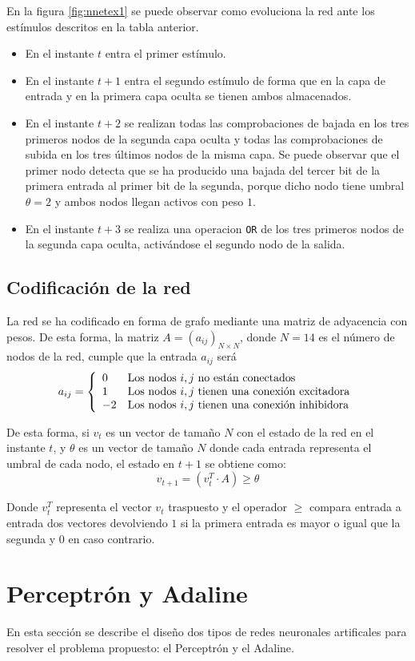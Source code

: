\documentclass[spanish]{assignment}
\begin{document}
	En la figura \ref{fig:nnetex1} se puede observar como evoluciona la red ante los estímulos descritos en la tabla anterior.
	
	
	\begin{itemize}
	\item En el instante $t$ entra el primer estímulo.
	\item En el instante $t+1$ entra el segundo estímulo de forma que en la capa de entrada y en la primera capa oculta se tienen ambos almacenados.
	\item En el instante $t+2$ se realizan todas las comprobaciones de bajada en los tres primeros nodos de la segunda capa oculta y todas las comprobaciones de subida en los tres últimos nodos de la misma capa. Se puede observar que el primer nodo detecta que se ha producido una bajada del tercer bit de la primera entrada al primer bit de la segunda, porque dicho nodo tiene umbral $\theta=2$ y ambos nodos llegan activos con peso $1$.
	
	\item En el instante $t+3$ se realiza una operacion \texttt{OR} de los tres primeros nodos de la segunda capa oculta, activándose el segundo nodo de la salida.
	\end{itemize} 
	
	\subsection{Codificación de la red}
	La red se ha codificado en forma de grafo mediante una matriz de adyacencia con pesos. De esta forma, la matriz $A = (a_{ij})_{N\times N}$, donde $N=14$ es el número de nodos de la red, cumple que la entrada $a_{ij}$ será
	\begin{equation*}
		a_{ij} = 
		\left\{
		\begin{array}{l l}
		0 & \text{Los nodos } i,j \text{ no están conectados}\\
		1 & \text{Los nodos } i,j \text{ tienen una conexión excitadora}\\
		-2 & \text{Los nodos } i,j \text{ tienen una conexión inhibidora}
		\end{array}
		\right.
	\end{equation*}
	
	De esta forma, si $v_t$ es un vector de tamaño $N$ con el estado de la red en el instante $t$, y $\theta$ es un vector de tamaño $N$ donde cada entrada representa el umbral de cada nodo, el estado en $t+1$ se obtiene como:
	$$v_{t+1} = \left(v_t^T\cdot A\right) \ge \theta$$
	
	Donde $v_t^T$ representa el vector $v_t$ traspuesto y el operador $\ge$ compara entrada a entrada dos vectores devolviendo $1$ si la primera entrada es mayor o igual que la segunda y $0$ en caso contrario.
	
	\section{Perceptrón y Adaline}
	En esta sección se describe el diseño dos tipos de redes neuronales artificales para resolver el problema propuesto: el Perceptrón y el Adaline.
	
	
	
\end{document}
